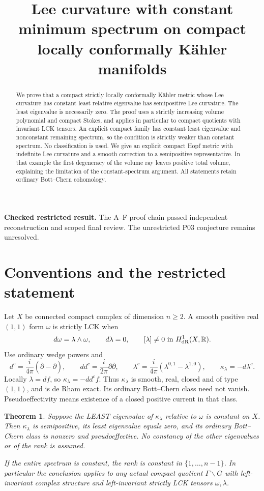 \documentclass[11pt]{article}
\title{Lee curvature with constant minimum spectrum\newline
on compact locally conformally K\"ahler manifolds}
\author{}\date{}
\newcommand{\ddc}{dd^c}
\newcommand{\dc}{d^c}
\newcommand{\kap}{\kappa_\lambda}
\newtheorem{theorem}{Theorem}
\theoremstyle{remark}\newtheorem{remark}[theorem]{Remark}
\begin{document}
\maketitle
\noindent\textbf{Checked restricted result.} The A--F proof chain passed
independent reconstruction and scoped final review. The unrestricted
P03 conjecture remains unresolved.
\begin{abstract}
We prove that a compact strictly locally conformally K\"ahler metric
whose Lee curvature has constant least relative eigenvalue has
semipositive Lee curvature. The least eigenvalue is necessarily zero. The proof uses a strictly increasing volume polynomial
and compact Stokes, and applies in particular to compact quotients
with invariant LCK tensors. An explicit compact family has constant
least eigenvalue and nonconstant remaining spectrum, so the condition
is strictly weaker than constant spectrum. No classification is used. We give an explicit compact Hopf metric with indefinite
Lee curvature and a smooth correction to a semipositive representative.
In that example the first degeneracy of the volume ray leaves positive
total volume, explaining the limitation of the constant-spectrum
argument. All statements retain ordinary Bott--Chern cohomology.
\end{abstract}

\section{Conventions and the restricted statement}
Let $X$ be connected compact complex of dimension $n\geq2$. A smooth
positive real $(1,1)$ form $\omega$ is strictly LCK when
\[
 d\omega=\lambda\wedge\omega,\qquad d\lambda=0,
 \qquad [\lambda]\ne0\text{ in }H^1_{\rm dR}(X,\mathbb R).
\]
Use ordinary wedge powers and
\[
 \dc=\frac{i}{4\pi}(\bar\partial-\partial),\qquad
 \ddc=\frac{i}{2\pi}\partial\bar\partial,\qquad
 \lambda^c=\frac{i}{4\pi}(\lambda^{0,1}-\lambda^{1,0}),
 \qquad\kap=-d\lambda^c.
\]
Locally $\lambda=df$, so $\kap=-\ddc f$. Thus $\kap$ is smooth,
real, closed and of type $(1,1)$, and is de Rham exact. Its ordinary
Bott--Chern class need not vanish. Pseudoeffectivity means existence
of a closed positive current in that class.

\begin{theorem}\label{th:constant}
Suppose the LEAST eigenvalue of $\kap$ relative to $\omega$ is
constant on $X$. Then $\kap$ is semipositive, its least eigenvalue
equals zero, and its ordinary Bott--Chern class is nonzero and
pseudoeffective. No constancy of the other eigenvalues or of the
rank is assumed.

If the entire spectrum is constant, the rank is constant in
$\{1,\ldots,n-1\}$. In particular the conclusion applies to any
actual compact quotient $\Gamma\backslash G$ with left-invariant
complex structure and left-invariant strictly LCK tensors
$\omega,\lambda$.
\end{theorem}
\end{document}
